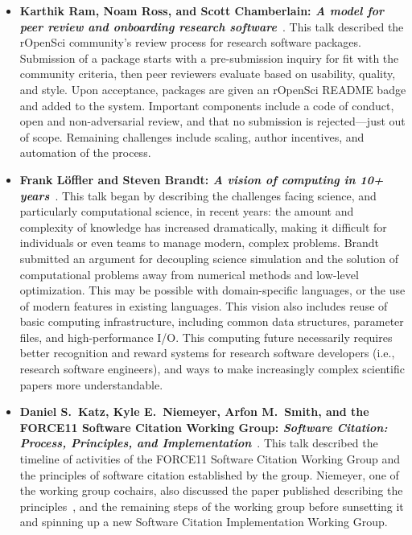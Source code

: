 \documentclass[11pt, oneside]{amsart}
\begin{document}
\begin{itemize}[itemsep=1ex]
    \item \textbf{Karthik Ram\textsuperscript{\textasteriskcentered}, Noam Ross,
    and Scott Chamberlain: \emph{A model for
    peer review and onboarding research software}}~\cite{Ram:2016ws}.
    This talk described the rOpenSci community's review process for research
    software packages. Submission of a package starts with a pre-submission inquiry
    for fit with the community criteria, then peer reviewers evaluate based on
    usability, quality, and style. Upon acceptance, packages are given an rOpenSci
    README badge and added to the system. Important components include a code of
    conduct, open and non-adversarial review, and that no submission is
    rejected---just out of scope. Remaining challenges include scaling, author
    incentives, and automation of the process.

    \item \textbf{Frank L\"{o}ffler and Steven Brandt\textsuperscript{\textasteriskcentered}:
    \emph{A vision of computing in 10+ years}}~\cite{Loffler:2016ws}.
    This talk began by describing the challenges facing science, and particularly
    computational science, in recent years: the amount and complexity of knowledge
    has increased dramatically, making it difficult for individuals or even teams to
    manage modern, complex problems.
    Brandt submitted an argument for decoupling science simulation and
    the solution of computational problems away from numerical methods and low-level
    optimization. This may be possible with domain-specific languages, or the use
    of modern features in existing languages. This vision also includes reuse of
    basic computing infrastructure, including common data structures, parameter files,
    and high-performance I\slash O. This computing future necessarily requires
    better recognition and reward systems for research software developers (i.e.,
    research software engineers), and ways to make increasingly complex scientific
    papers more understandable.


    \item \textbf{Daniel S.~Katz, Kyle E.~Niemeyer\textsuperscript{\textasteriskcentered},
    Arfon M.~Smith, and the FORCE11 Software Citation Working Group:
    \emph{Software Citation: Process, Principles, and Implementation}}~\cite{Katz:2016ws}.
    This talk described the timeline of activities of the FORCE11 Software Citation
    Working Group and the principles of software citation established by the group.
    Niemeyer, one of the working group cochairs, also discussed the paper published
    describing the principles~\cite{Smith:2016sc}, and the remaining steps of the
    working group before sunsetting it and spinning up a new Software Citation
    Implementation Working Group.


\end{itemize}
\end{document}
